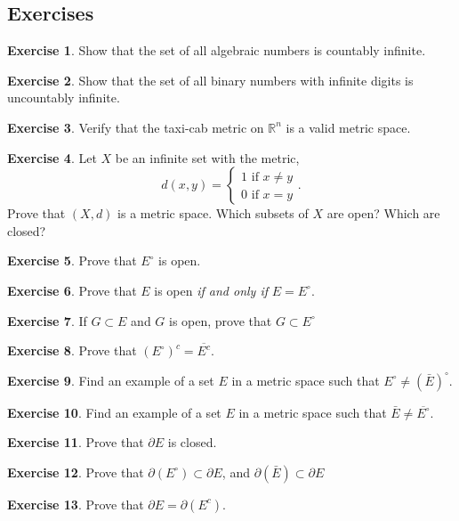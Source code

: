 \documentclass{article}
\newcommand{\R}{\mathbb{R}}
\theoremstyle{definition}
\newtheorem{ex}{Exercise}[section]
\begin{document}
\subsection{Exercises}
\begin{ex}
	Show that the set of all algebraic numbers is countably infinite.
\end{ex}
\begin{ex}
	Show that the set of all binary numbers with infinite digits is uncountably infinite.
\end{ex}
\begin{ex}
	Verify that the taxi-cab metric on $ \R^n $ is a valid metric space.
\end{ex}
\begin{ex}
	Let $ X $ be an infinite set with the metric, $$d(x,y)=\begin{cases}
		1\text{ if }x\neq y\\
	0\text{ if }x=y
	\end{cases} .$$ Prove that $ (X,d) $ is a metric space. Which subsets of $ X $ are open? Which are closed? 
\end{ex}
\begin{ex}
	Prove that $ E^\circ $ is open.
\end{ex}
\begin{ex}
	Prove that $ E $ is open \textit{if and only if} $ E=E^\circ $.
\end{ex}
\begin{ex}
	If $ G\subset E $ and $ G $ is open, prove that $ G\subset E^\circ $
\end{ex}
\begin{ex}
	Prove that $ (E^\circ)^c=\overline{E^c} $.
\end{ex}
\begin{ex}
	Find an example of a set $ E  $ in a metric space such that $ E^\circ\neq(\bar{E} )^\circ$.
\end{ex}
\begin{ex}
	Find an example of a set $ E  $ in a metric space such that $ \bar{E}\neq\overline{E^\circ}$.
\end{ex}
\begin{ex}
	Prove that $ \partial E $ is closed.
\end{ex}
\begin{ex}
	Prove that $ \partial(E^\circ)\subset \partial E  $, and $ \partial(\bar{E})\subset \partial E  $
\end{ex}
\begin{ex}
	Prove that $ \partial E=\partial (E^c)  $.
\end{ex}
\end{document}
